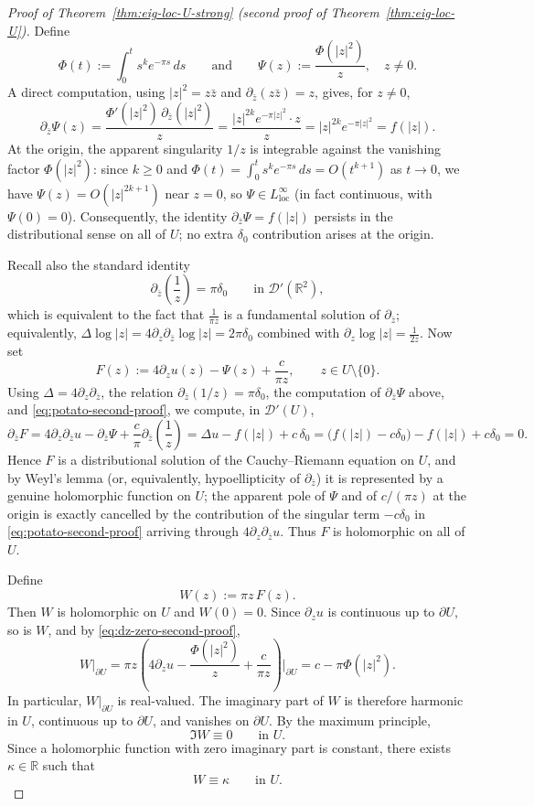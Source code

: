 \documentclass[a4paper,11pt,reqno]{amsart}
\numberwithin{equation}{section}
\theoremstyle{plain} %
\theoremstyle{definition} %
\theoremstyle{remark}
\newcommand{\R}{\mathbb{R}}
\begin{document}
\begin{proof}[Proof of Theorem~\ref{thm:eig-loc-U-strong} (second proof of Theorem~\ref{thm:eig-loc-U})]
Define
\[
\Phi(t):=\int_0^t s^k e^{-\pi s}\,ds
\qquad\text{and}\qquad
\Psi(z):=\frac{\Phi(|z|^2)}{z},
\quad z\neq 0.
\]
A direct computation, using \(|z|^2=z\bar z\) and \(\partial_{\bar z}(z\bar z)=z\), gives, for
\(z\neq 0\),
\[
\partial_{\bar z}\Psi(z)
=
\frac{\Phi'(|z|^2)\,\partial_{\bar z}(|z|^2)}{z}
=
\frac{|z|^{2k}e^{-\pi|z|^2}\cdot z}{z}
=
|z|^{2k}e^{-\pi|z|^2}
=
f(|z|).
\]
At the origin, the apparent singularity \(1/z\) is integrable against the vanishing factor
\(\Phi(|z|^2)\): since \(k\ge 0\) and \(\Phi(t)=\int_0^t s^k e^{-\pi s}\,ds=O(t^{k+1})\) as
\(t\to 0\), we have \(\Psi(z)=O(|z|^{2k+1})\) near \(z=0\), so \(\Psi\in L^\infty_{\mathrm{loc}}\)
(in fact continuous, with \(\Psi(0)=0\)). Consequently, the identity
\(\partial_{\bar z}\Psi=f(|z|)\) persists in the distributional sense on all of \(U\); no extra
\(\delta_0\) contribution arises at the origin.

Recall also the standard identity
\[
\partial_{\bar z}\!\left(\frac{1}{z}\right)=\pi\delta_0
\qquad\text{in }\mathcal D'(\R^2),
\]
which is equivalent to the fact that \(\frac{1}{\pi z}\) is a fundamental solution of
\(\partial_{\bar z}\); equivalently, \(\Delta\log|z|=4\partial_z\partial_{\bar z}\log|z|=2\pi\delta_0\)
combined with \(\partial_z\log|z|=\frac{1}{2z}\). Now set
\[
F(z):=4\partial_z u(z)-\Psi(z)+\frac{c}{\pi z},
\qquad z\in U\setminus\{0\}.
\]
Using \(\Delta=4\partial_z\partial_{\bar z}\), the relation \(\partial_{\bar z}(1/z)=\pi\delta_0\),
the computation of \(\partial_{\bar z}\Psi\) above, and \eqref{eq:potato-second-proof}, we
compute, in \(\mathcal D'(U)\),
\[
\partial_{\bar z}F
=
4\partial_z\partial_{\bar z}u-\partial_{\bar z}\Psi+\frac{c}{\pi}\partial_{\bar z}\!\left(\frac{1}{z}\right)
=
\Delta u-f(|z|)+c\,\delta_0
=
\bigl(f(|z|)-c\delta_0\bigr)-f(|z|)+c\delta_0
=0.
\]
Hence \(F\) is a distributional solution of the Cauchy--Riemann equation on \(U\), and by
Weyl's lemma (or, equivalently, hypoellipticity of \(\partial_{\bar z}\)) it is represented by a
genuine holomorphic function on \(U\); the apparent pole of \(\Psi\) and of \(c/(\pi z)\) at the
origin is exactly cancelled by the contribution of the singular term \(-c\delta_0\) in
\eqref{eq:potato-second-proof} arriving through \(4\partial_z\partial_{\bar z}u\). Thus \(F\) is
holomorphic on all of \(U\).

Define
\[
W(z):=\pi z\,F(z).
\]
Then \(W\) is holomorphic on \(U\) and \(W(0)=0\). Since \(\partial_z u\) is continuous up to
\(\partial U\), so is \(W\), and by \eqref{eq:dz-zero-second-proof},
\[
W|_{\partial U}
=
\pi z\left(4\partial_z u-\frac{\Phi(|z|^2)}{z}+\frac{c}{\pi z}\right)\Big|_{\partial U}
=
c-\pi\Phi(|z|^2).
\]
In particular, \(W|_{\partial U}\) is real-valued. The imaginary part of \(W\) is therefore
harmonic in \(U\), continuous up to \(\partial U\), and vanishes on \(\partial U\). By the
maximum principle,
\[
\Im W\equiv 0
\qquad\text{in }U.
\]
Since a holomorphic function with zero imaginary part is constant, there exists \(\kappa\in\R\)
such that
\[
W\equiv \kappa
\qquad\text{in }U.
\]


\end{proof}
\end{document}
